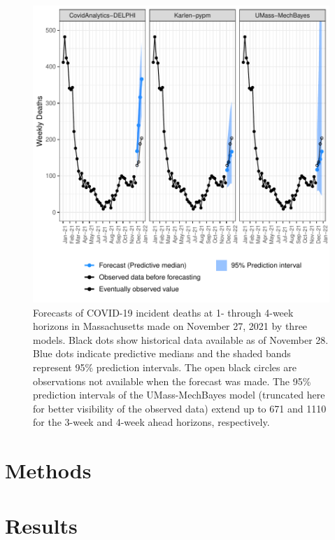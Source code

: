 \documentclass{article}
\theoremstyle{definition}
\begin{document}
\begin{figure}[b!]
\centering

\includegraphics{manuscript-fig1.motivation-example}

\caption{Forecasts of COVID-19 incident deaths at 1- through 4-week horizons in Massachusetts made on November 27, 2021 by three models. Black dots show historical data available as of November 28. Blue dots indicate predictive medians and the shaded bands represent 95\% prediction intervals. The open black circles are observations not available when the forecast was made. The 95\% prediction intervals of the UMass-MechBayes model (truncated here for better visibility of the observed data) extend up to 671 and 1110 for the 3-week and 4-week ahead horizons, respectively. }
\label{fig:forecasts-example}
\end{figure}

\newpage
\section{Methods}\label{sec:methods}

\newpage
\section{Results}\label{sec:result}
\end{document}
